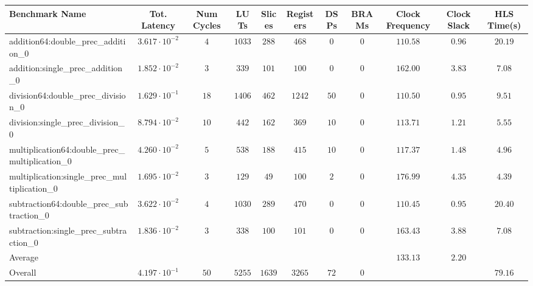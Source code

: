 \begin{tabular}{|l|c|c|c|c|c|c|c|c|c|c|}
\hline
Benchmark Name                                   & Tot. Latency            & Num Cycles & LUTs     & Slices   & Registers & DSPs   & BRAMs & Clock Frequency & Clock Slack & HLS Time(s) \\
\hline
addition64:double\_prec\_addition\_0             & $ 3.617 \cdot 10^{-2} $ & $ 4      $ & $ 1033 $ & $ 288  $ & $ 468   $ & $ 0  $ & $ 0 $ & $ 110.58      $ & $ 0.96    $ & $ 20.19   $ \\
addition:single\_prec\_addition\_0               & $ 1.852 \cdot 10^{-2} $ & $ 3      $ & $ 339  $ & $ 101  $ & $ 100   $ & $ 0  $ & $ 0 $ & $ 162.00      $ & $ 3.83    $ & $ 7.08    $ \\
division64:double\_prec\_division\_0             & $ 1.629 \cdot 10^{-1} $ & $ 18     $ & $ 1406 $ & $ 462  $ & $ 1242  $ & $ 50 $ & $ 0 $ & $ 110.50      $ & $ 0.95    $ & $ 9.51    $ \\
division:single\_prec\_division\_0               & $ 8.794 \cdot 10^{-2} $ & $ 10     $ & $ 442  $ & $ 162  $ & $ 369   $ & $ 10 $ & $ 0 $ & $ 113.71      $ & $ 1.21    $ & $ 5.55    $ \\
multiplication64:double\_prec\_multiplication\_0 & $ 4.260 \cdot 10^{-2} $ & $ 5      $ & $ 538  $ & $ 188  $ & $ 415   $ & $ 10 $ & $ 0 $ & $ 117.37      $ & $ 1.48    $ & $ 4.96    $ \\
multiplication:single\_prec\_multiplication\_0   & $ 1.695 \cdot 10^{-2} $ & $ 3      $ & $ 129  $ & $ 49   $ & $ 100   $ & $ 2  $ & $ 0 $ & $ 176.99      $ & $ 4.35    $ & $ 4.39    $ \\
subtraction64:double\_prec\_subtraction\_0       & $ 3.622 \cdot 10^{-2} $ & $ 4      $ & $ 1030 $ & $ 289  $ & $ 470   $ & $ 0  $ & $ 0 $ & $ 110.45      $ & $ 0.95    $ & $ 20.40   $ \\
subtraction:single\_prec\_subtraction\_0         & $ 1.836 \cdot 10^{-2} $ & $ 3      $ & $ 338  $ & $ 100  $ & $ 101   $ & $ 0  $ & $ 0 $ & $ 163.43      $ & $ 3.88    $ & $ 7.08    $ \\
\hline
Average                                          & $                     $ & $        $ & $      $ & $      $ & $       $ & $    $ & $   $ & $ 133.13      $ & $ 2.20    $ & $         $ \\
\hline
Overall                                          & $ 4.197 \cdot 10^{-1} $ & $ 50     $ & $ 5255 $ & $ 1639 $ & $ 3265  $ & $ 72 $ & $ 0 $ & $             $ & $         $ & $ 79.16   $ \\
\hline
\end{tabular}
